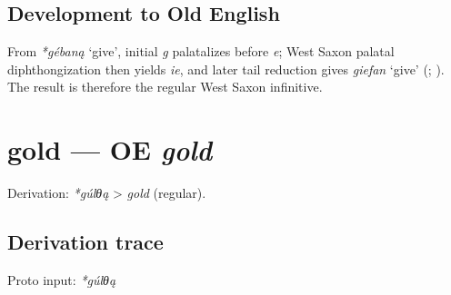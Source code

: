 \documentclass[
  british,
  a4paper,
  openany]{book}
\providecommand{\Recon}[1]{\emph{*#1}}
{\catcode`→=\active \global\def→{\ensuremath{\rightarrow}}}
\providecommand{\texorpdfstring}[2]{#1}
\providecommand{\Recon}[1]{\emph{*#1}}
{\catcode`→=\active \global\def→{\ensuremath{\rightarrow}}}
\begin{document}
\subsection{Development to Old
English}\label{development-to-old-english-21}

From \Recon{gébaną} `give', initial \emph{g} palatalizes before
\emph{e}; West Saxon palatal diphthongization then yields \emph{ie}, and
later tail reduction gives {\emph{giefan}} `give'
(;
). The result is
therefore the regular West Saxon infinitive.

\section{\texorpdfstring{gold --- OE
\emph{gold}}{gold --- OE gold}}\label{gold-oe-gold}


Derivation: \emph{*gúlθą} \textgreater{} \emph{gold} (regular).

\subsection{Derivation trace}\label{derivation-trace-22}

Proto input: \emph{*gúlθą}

\begingroup
\setlength{\fboxsep}{6pt}
\end{document}
